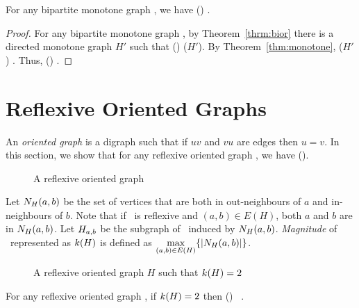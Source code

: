 \begin{theorem} 
For any bipartite monotone graph \mH, we have \chom(\mH) \maple \cbis\@.
\end{theorem}

\begin{proof}
For any bipartite monotone graph \mH, by Theorem~\ref{thrm:bior} there is a directed monotone 
graph \(H'\) such that \chom(\mH) \maple \chom(\(H'\))\@. By Theorem~\ref{thm:monotone},
\chom(\(H'\)) \maple \cbis\@. Thus, \chom(\mH) \maple \cbis\@.
\end{proof}

\section{Reflexive Oriented Graphs}
An \emph{oriented graph} is a digraph such that if \(uv\) and \(vu\) are edges then \(u=v\)\@.
In this section, we show that for any reflexive oriented graph \mH, we have \cbis \maple \chom(\mH)\@.

\begin{figure}[h]
\center{}
\caption{A reflexive oriented graph}
\end{figure}

Let \(N_{H}({a},{b})\) be the set of vertices that are both in
out-neighbours of \(a\) and in-neighbours of \(b\).
Note that if \mH\ is reflexive and \((a,b)\in E(H)\),
both \(a\) and \(b\) are in \(N_{H}({a},{b})\)\@.
Let \(H_{a,b}\) be the subgraph of \mH\ induced by \(N_{H}({a},{b})\).
\emph{Magnitude} of \mH\ represented as \(k(H)\) is defined as
\(\max \limits_{(a,b) \in E(H)} \{{|N_{H}({a},{b})|}\}\)\@.

\begin{figure}[h]
\center{}
\caption{A reflexive oriented graph \ensuremath{H} such that \ensuremath{\magf(H)=2}}
\end{figure}

\begin{lemma} \label{lem:triangle-free}
For any reflexive oriented graph \mH, if \(k(H)=2\) then \chom(\mH) \mapge\ \cbis\@.
\end{lemma}

